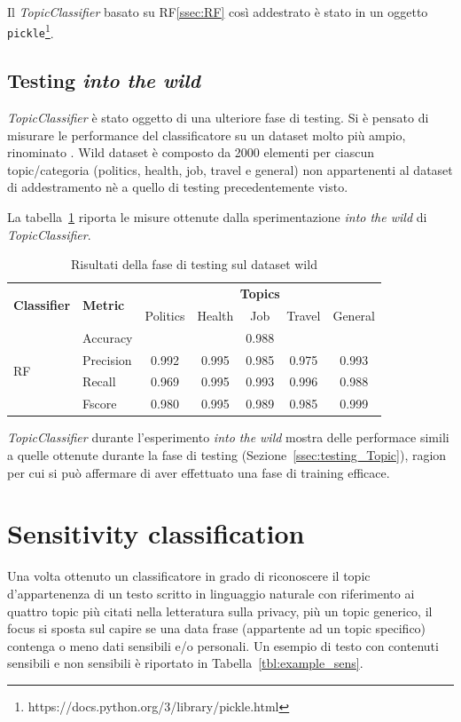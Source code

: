 Il \textit{TopicClassifier} basato su RF\ref{ssec:RF} così addestrato è stato  in un oggetto {\tt pickle}\footnote{https://docs.python.org/3/library/pickle.html}.

\subsection{Testing \textit{into the wild}}
\label{ssec:testing_wild}
\textit{TopicClassifier} è stato oggetto di una ulteriore fase di testing. Si è pensato di misurare le performance del classificatore su un dataset molto più ampio, rinominato . Wild dataset è composto da 2000 elementi per ciascun topic/categoria (politics, health, job, travel e general) non appartenenti al dataset di addestramento nè a quello di testing precedentemente visto.

La tabella~\ref{tbl:testing_wild} riporta le misure ottenute dalla sperimentazione \textit{into the wild} di \textit{TopicClassifier}. 
\begin{table}[h]
\begin{tabular}{|l|l|c|c|c|c|c|}
\hline
\multirow{2}{*}{\textbf{Classifier}} & \multirow{2}{*}{\textbf{Metric}} & \multicolumn{5}{c|}{\textbf{Topics}} \\ \cline{3-7} 
 &  & Politics & Health & Job & Travel & General \\ \hline
\multirow{4}{*}{RF} & Accuracy & \multicolumn{5}{c|}{0.988} \\ \cline{2-7} 
 & Precision & 0.992 & 0.995 & 0.985 & 0.975 & 0.993 \\ \cline{2-7} 
 & Recall & 0.969 & 0.995 & 0.993 & 0.996 & 0.988 \\ \cline{2-7} 
 & Fscore & 0.980 & 0.995 & 0.989 & 0.985 & 0.999 \\ \hline
\end{tabular}
\caption{Risultati della fase di testing sul dataset wild}
\label{tbl:testing_wild}
\end{table}
\FloatBarrier
\textit{TopicClassifier} durante l'esperimento \textit{into the wild} mostra delle performace simili a quelle ottenute durante la fase di testing (Sezione~\ref{ssec:testing_Topic}), ragion per cui si può affermare di aver effettuato una fase di training efficace.

\section{Sensitivity classification}
\label{sec:sensclass}
Una volta ottenuto un classificatore in grado di riconoscere il topic d'appartenenza di un testo scritto in linguaggio naturale con riferimento ai quattro topic più citati nella letteratura sulla privacy, più un topic generico, il focus si sposta sul capire se una data frase (appartente ad un topic specifico) contenga o meno dati sensibili e/o personali. Un esempio di testo con contenuti sensibili e non sensibili è riportato in Tabella~\ref{tbl:example_sens}.


